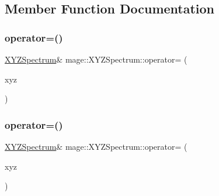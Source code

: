 \subsection{Member Function Documentation}
\hypertarget{structmage_1_1_x_y_z_spectrum_afb9ded2a6c69514b9853f753c5f94f98}{}\label{structmage_1_1_x_y_z_spectrum_afb9ded2a6c69514b9853f753c5f94f98} 
\subsubsection{\texorpdfstring{operator=()}{operator=()}\hspace{0.1cm}{\footnotesize\ttfamily [1/2]}}
{\footnotesize\ttfamily \hyperlink{structmage_1_1_x_y_z_spectrum}{X\+Y\+Z\+Spectrum}\& mage\+::\+X\+Y\+Z\+Spectrum\+::operator= (\begin{DoxyParamCaption}\item[{const \hyperlink{structmage_1_1_x_y_z_spectrum}{X\+Y\+Z\+Spectrum} \&}]{xyz }\end{DoxyParamCaption})\hspace{0.3cm}{\ttfamily [default]}}

\hypertarget{structmage_1_1_x_y_z_spectrum_a5191cffff5e1560164a34d43aa72441b}{}\label{structmage_1_1_x_y_z_spectrum_a5191cffff5e1560164a34d43aa72441b} 
\subsubsection{\texorpdfstring{operator=()}{operator=()}\hspace{0.1cm}{\footnotesize\ttfamily [2/2]}}
{\footnotesize\ttfamily \hyperlink{structmage_1_1_x_y_z_spectrum}{X\+Y\+Z\+Spectrum}\& mage\+::\+X\+Y\+Z\+Spectrum\+::operator= (\begin{DoxyParamCaption}\item[{\hyperlink{structmage_1_1_x_y_z_spectrum}{X\+Y\+Z\+Spectrum} \&\&}]{xyz }\end{DoxyParamCaption})\hspace{0.3cm}{\ttfamily [default]}}

